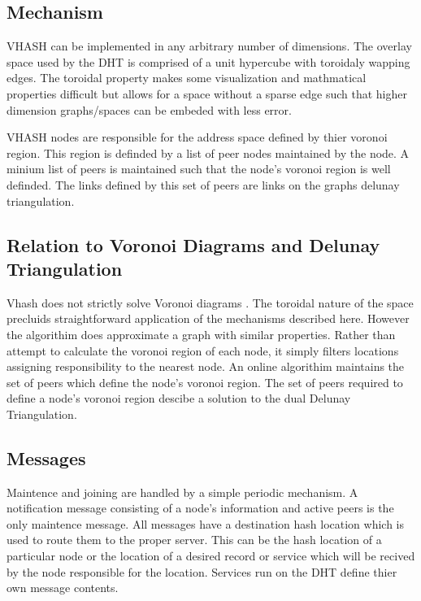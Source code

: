 \documentclass[11pt]{IEEEtran} %
\begin{document}
\subsection{Mechanism}
VHASH can be implemented in any arbitrary number of dimensions. The overlay space used by the DHT is comprised of a unit hypercube with toroidaly wapping edges. The toroidal property makes some visualization and mathmatical properties difficult but allows for a space without a sparse edge such that higher dimension graphs/spaces can be embeded with less error.

VHASH nodes are responsible for the address space defined by thier voronoi region. This region is definded by a list of peer nodes maintained by the node. A minium list of peers is maintained such that the node's voronoi region is well definded. The links defined by this set of peers are links on the graphs delunay triangulation. 

\subsection{Relation to Voronoi Diagrams and Delunay Triangulation}

Vhash does not strictly solve Voronoi diagrams \cite{voronoi}. The toroidal nature of the space precluids straightforward application of the mechanisms described here\cite{voronoi}. However the algorithim does approximate a graph with similar properties. Rather than attempt to calculate the voronoi region of each node, it simply filters locations assigning responsibility to the nearest node. An online algorithim maintains the set of peers which define the node's voronoi region. The set of peers required to define a node's voronoi region descibe a solution to the dual Delunay Triangulation.



\subsection{Messages}
Maintence and joining are handled by a simple periodic mechanism. A notification message consisting of a node's information and active peers is the only maintence message. All messages have a destination hash location which is used to route them to the proper server. This can be the hash location of a particular node or the location of a desired record or service which will be recived by the node responsible for the location. Services run on the DHT define thier own message contents.
\end{document}
